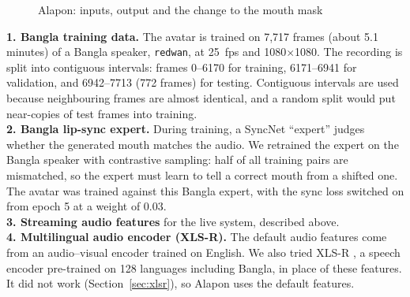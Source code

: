 \begin{figure}[H]
{}
    \caption{Alapon: inputs, output and the change to the mouth mask}
    \label{fig:Alapon}
\end{figure}

\noindent
\textbf{1. Bangla training data.} The avatar is trained on 7,717 frames (about 5.1 minutes) of a Bangla speaker, \texttt{redwan}, at 25~fps and 1080$\times$1080. The recording is split into contiguous intervals: frames 0--6170 for training, 6171--6941 for validation, and 6942--7713 (772 frames) for testing. Contiguous intervals are used because neighbouring frames are almost identical, and a random split would put near-copies of test frames into training.\\

\noindent
\textbf{2. Bangla lip-sync expert.} During training, a SyncNet ``expert'' judges whether the generated mouth matches the audio. We retrained the expert on the Bangla speaker with contrastive sampling: half of all training pairs are mismatched, so the expert must learn to tell a correct mouth from a shifted one. The avatar was trained against this Bangla expert, with the sync loss switched on from epoch 5 at a weight of 0.03.\\

\noindent
\textbf{3. Streaming audio features} for the live system, described above.\\

\noindent
\textbf{4. Multilingual audio encoder (XLS-R).} The default audio features come from an audio--visual encoder trained on English. We also tried XLS-R \cite{babu2022xlsr}, a speech encoder pre-trained on 128 languages including Bangla, in place of these features. It did not work (Section~\ref{sec:xlsr}), so Alapon uses the default features.\\

